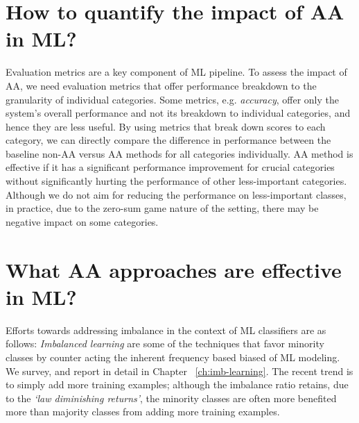 \section{How to quantify the impact of AA in ML?}
Evaluation metrics are a key component of ML pipeline.
To assess the impact of AA, we need evaluation metrics that offer performance breakdown to the granularity of individual categories.
Some metrics, e.g. \textit{accuracy},  offer only the system's overall performance and not its breakdown to individual categories, and hence they are less useful.
By using metrics that break down scores to each category, we can directly compare the difference in performance between the baseline non-AA versus AA methods for all categories individually.
AA method is effective if it has a significant performance improvement for crucial categories without significantly hurting the performance of other less-important categories. 
Although we do not aim for reducing the performance on less-important classes, in practice, due to the zero-sum game nature of the setting, there may be negative impact on some categories.

\section{What AA approaches are effective in ML?}
Efforts towards addressing imbalance in the context of ML classifiers are as follows:
\textit{Imbalanced learning} are some of the techniques that favor minority classes by counter acting the inherent frequency based biased of ML modeling.
We survey, and report in detail in Chapter ~\ref{ch:imb-learning}.
The recent trend is to simply add more training examples; although the imbalance ratio retains,  due to the \textit{`law diminishing returns'}, the minority classes are often more benefited more than majority classes from adding more training examples.
